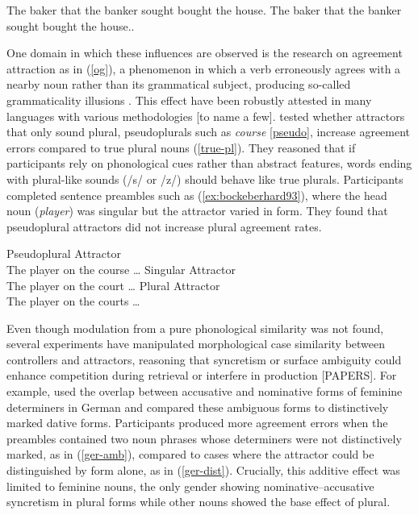\documentclass[
  authoryear,
  3p]{elsarticle}
\begin{document}
\begin{exe}
\ex \label{baker} The baker that the banker sought bought the house.
\ex \label{runner} The baker that the banker sought bought the house..
\end{exe}

One domain in which these influences are observed is the research on
agreement attraction as in (\ref{og}), a phenomenon in which a verb
erroneously agrees with a nearby noun rather than its grammatical
subject, producing so-called grammaticality illusions
\citep{BockMiller:1991, PearlmutterGarnseyBock:1999}. This effect have
been robustly attested in many languages with various methodologies
{[}to name a few{]}. \citet{BockEberhard1993} tested whether attractors
that only sound plural, pseudoplurals such as \emph{course}
\ref{pseudo}, increase agreement errors compared to true plural nouns
(\ref{true-pl}). They reasoned that if participants rely on phonological
cues rather than abstract features, words ending with plural-like sounds
(/s/ or /z/) should behave like true plurals. Participants completed
sentence preambles such as (\ref{ex:bockeberhard93}), where the head
noun (\emph{player}) was singular but the attractor varied in form. They
found that pseudoplural attractors did not increase plural agreement
rates.

\begin{exe} 
\ex \label{ex:bockeberhard93}
\begin{xlist}
    \ex \label{pseudo} {Pseudoplural Attractor} \\ The {player} on the {course} \ldots{}
    \ex \label{true-sg} {Singular Attractor} \\ The {player} on the {court} \ldots{}
    \ex \label{true-pl} {Plural Attractor} \\ The {player} on the {courts} \ldots{}
\end{xlist}
\end{exe}

Even though modulation from a pure phonological similarity was not
found, several experiments have manipulated morphological case
similarity between controllers and attractors, reasoning that syncretism
or surface ambiguity could enhance competition during retrieval or
interfere in production {[}PAPERS{]}. For example,
\citet{HartsuikerEtAl2003} used the overlap between accusative and
nominative forms of feminine determiners in German and compared these
ambiguous forms to distinctively marked dative forms. Participants
produced more agreement errors when the preambles contained two noun
phrases whose determiners were not distinctively marked, as in
(\ref{ger-amb}), compared to cases where the attractor could be
distinguished by form alone, as in (\ref{ger-dist}). Crucially, this
additive effect was limited to feminine nouns, the only gender showing
nominative--accusative syncretism in plural forms while other nouns
showed the base effect of plural.
\end{document}
